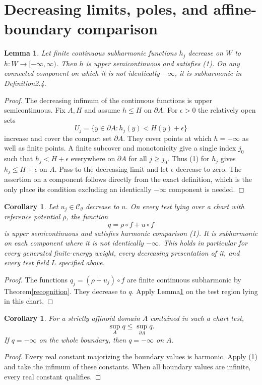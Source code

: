 \documentclass[11pt]{article}
\newtheorem{lemma}[theorem]{Lemma}
\newtheorem{corollary}[theorem]{Corollary}
\begin{document}
\section{Decreasing limits, poles, and affine-boundary comparison}
\begin{lemma}\label{decreasing}
Let finite continuous subharmonic functions $h_j$ decrease on $W$ to
$h:W\to[-\infty,\infty)$. Then $h$ is upper semicontinuous and satisfies
(1). On any connected component on which it is not identically
$-\infty$, it is subharmonic in Definition2.4.
\end{lemma}
\begin{proof}
The decreasing infimum of the continuous functions is upper
semicontinuous. Fix $A,H$ and assume $h\le H$ on $\partial A$.
For $\epsilon>0$ the relatively open sets
\[
 U_j=\{y\in\partial A:h_j(y)<H(y)+\epsilon\}
\]
increase and cover the compact set $\partial A$.
They cover points at which $h=-\infty$ as well as finite points.
A finite subcover and monotonicity give a single index $j_0$ such that
$h_j<H+\epsilon$ everywhere on $\partial A$ for all $j\ge j_0$.
Thus (1) for $h_j$ gives $h_j\le H+\epsilon$ on $A$.
Pass to the decreasing limit and let $\epsilon$ decrease to zero.
The assertion on a component follows directly from the exact definition,
which is the only place its condition excluding an identically
$-\infty$ component is needed.
\end{proof}

\begin{corollary}\label{weights}
Let $u_j\in\mathcal C_\theta$ decrease to $u$. On every test lying over
a chart with reference potential $\rho$, the function
\[
 q=\rho\circ f+u\circ f
\]
is upper semicontinuous and satisfies harmonic comparison (1).
It is subharmonic on each component where it is not identically
$-\infty$. This holds in particular for every generated finite-energy
weight, every decreasing presentation of it, and every test field $L$
specified above.
\end{corollary}
\begin{proof}
The functions $q_j=(\rho+u_j)\circ f$ are finite continuous
subharmonic by Theorem\ref{recognition}. They decrease to $q$.
Apply Lemma\ref{decreasing} on the test region lying in this chart.
\end{proof}

\begin{corollary}\label{maximum}
For a strictly affinoid domain $A$ contained in such a chart test,
\[
 \sup_A q\le\sup_{\partial A}q.
\]
If $q=-\infty$ on the whole boundary, then $q=-\infty$ on $A$.
\end{corollary}
\begin{proof}
Every real constant majorizing the boundary values is harmonic.
Apply (1) and take the infimum of these constants. When all boundary
values are infinite, every real constant qualifies.
\end{proof}
\end{document}
